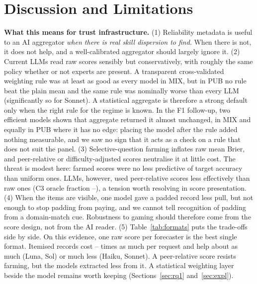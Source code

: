 \documentclass[11pt,letterpaper]{article}
\begin{document}
\section{Discussion and Limitations}\label{sec:disc}
\textbf{What this means for trust infrastructure.} (1) Reliability metadata is useful to an AI aggregator \emph{when
there is real skill dispersion to find}. When there is not, it does not help, and a well-calibrated aggregator should
largely ignore it. (2) Current LLMs read raw scores sensibly but conservatively, with roughly the same policy whether or not experts
are present. A transparent cross-validated weighting rule was at least as good as every model in MIX, but in PUB no
rule beat the plain mean and the same rule was nominally worse than every LLM (significantly so for Sonnet). A
statistical aggregate is therefore a strong default only when the right rule for the regime is known. In the F1
follow-up, two efficient models shown that aggregate returned it almost unchanged, in MIX and equally in PUB where it
has no edge: placing the model after the rule added nothing measurable, and we saw no sign that it acts as a check on a
rule that does not suit the panel. (3) Selective-question farming inflates raw mean Brier, and peer-relative or difficulty-adjusted scores neutralise it
at little cost. The threat is modest here: farmed scores were no less predictive of target accuracy than uniform ones.
LLMs, however, used peer-relative scores less effectively than raw ones (C3 oracle fraction
\oracleFracCthreeHaiku--\oracleFracCthreeLuna), a tension worth resolving in score presentation. (4) When the
items are visible, one model gave a padded record less pull, but not enough to stop padding from paying, and we cannot
tell recognition of padding from a domain-match cue. Robustness to gaming should therefore come from the score design,
not from the AI reader. (5) Table~\ref{tab:formats} puts the trade-offs side by side. On this evidence, one raw score
per forecaster is the best single format. Itemised records cost \costRatioConeHaiku--\costRatioConeLuna{} times as much per request and help about as much (Luna,
Sol) or much less (Haiku, Sonnet). A peer-relative score resists farming, but the models extracted less from it. A statistical weighting layer beside the model
remains worth keeping (Sections~\ref{sec:rq1} and~\ref{sec:expl}).
\end{document}

